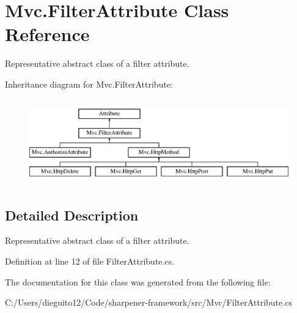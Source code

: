 \hypertarget{class_mvc_1_1_filter_attribute}{}\section{Mvc.\+Filter\+Attribute Class Reference}
\label{class_mvc_1_1_filter_attribute}


Representative abstract class of a filter attribute.  


Inheritance diagram for Mvc.\+Filter\+Attribute\+:\begin{figure}[H]
\begin{center}
\leavevmode
\includegraphics[height=3.733333cm]{class_mvc_1_1_filter_attribute}
\end{center}
\end{figure}


\subsection{Detailed Description}
Representative abstract class of a filter attribute. 



Definition at line 12 of file Filter\+Attribute.\+cs.



The documentation for this class was generated from the following file\+:\begin{DoxyCompactItemize}
\item 
C\+:/\+Users/dieguito12/\+Code/sharpener-\/framework/src/\+Mvc/Filter\+Attribute.\+cs\end{DoxyCompactItemize}
